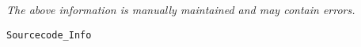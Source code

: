 \label{pkg:sourcecode\_info}

{\tiny \it The above information is manually maintained and may contain errors.}
\begin{verbatim}
Sourcecode_Info
\end{verbatim}
